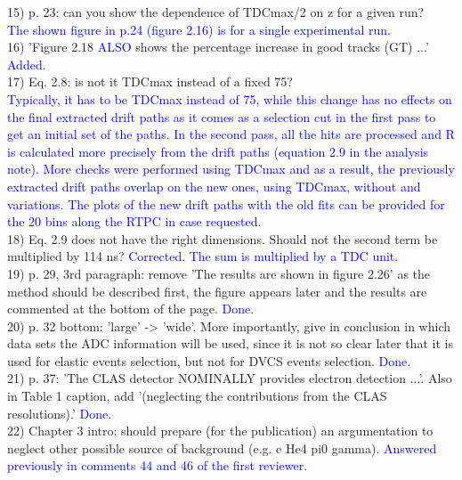 15) p. 23: can you show the dependence of TDCmax/2 on z for a given run? \\ 
\textcolor{blue}{ The shown figure in p.24 (figure 2.16) is for a single 
experimental run.} \\

16) 'Figure 2.18 \textcolor{blue}{ALSO} shows the percentage increase in good 
tracks (GT) ...' \textcolor{blue}{ Added.}\\

17) Eq. 2.8: is not it TDCmax instead of a fixed 75?\\
\textcolor{blue}{Typically, it has to be TDCmax instead of 75, while this 
   change has no effects on the final extracted drift paths as it comes as a 
selection cut in the first pass to get an initial set of the paths. In the 
second pass, all the hits are processed and R is calculated more precisely from 
the drift paths (equation 2.9 in the analysis note). More checks were performed 
using TDCmax and as a result, the previously extracted drift paths overlap on 
the new ones, using TDCmax, without and variations. The plots of the new drift 
paths with the old fits can be provided for the 20 bins along the RTPC in case 
requested.}\\

18) Eq. 2.9 does not have the right dimensions. Should not the second term be 
multiplied by 114 ns?
\textcolor{blue}{ Corrected. The sum is multiplied by a TDC unit.}\\

19) p. 29, 3rd paragraph: remove 'The results are shown in figure 2.26' as the 
method should be described first, the figure appears later and the results are 
commented at the bottom of the page.
\textcolor{blue}{  Done.}\\

20) p. 32 bottom: 'large' -> 'wide'. More importantly, give in conclusion in which 
data sets the ADC information will be used, since it is not so clear later that 
it is used for elastic events selection, but not for DVCS events selection.
\textcolor{blue}{  Done.}\\

21) p. 37: 'The CLAS detector NOMINALLY provides electron detection ...'. Also 
in Table 1 caption, add '(neglecting the contributions from the CLAS 
resolutions).'
\textcolor{blue}{  Done.}\\

22) Chapter 3 intro: should prepare (for the publication) an argumentation to 
neglect other possible source of background (e.g. e He4 pi0 gamma).
\textcolor{blue}{ Answered previously in comments 44 and 46 of the first 
reviewer.}\\

